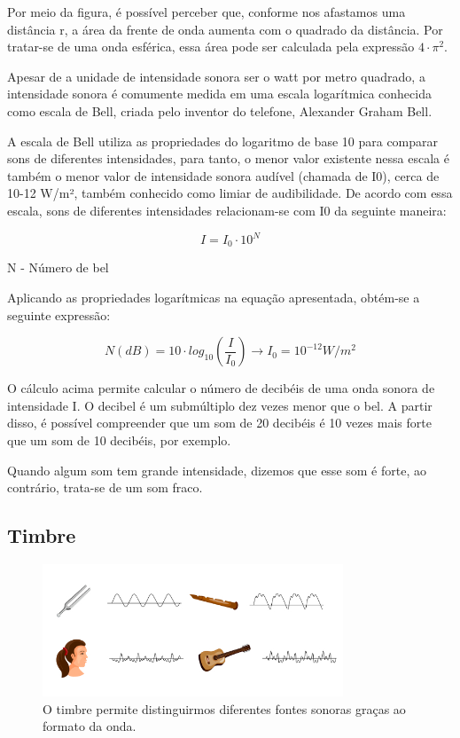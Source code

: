 \documentclass[
	article,		
	11pt,			
	oneside,		
	a4paper,			
	english,			
	brazil			
]{abntex2}
\begin{document}
Por meio da figura, é possível perceber que, conforme nos afastamos uma distância r, a área da frente de onda aumenta com o quadrado da distância. Por tratar-se de uma onda esférica, essa área pode ser calculada pela expressão $4 \cdot \pi^2$.

Apesar de a unidade de intensidade sonora ser o watt por metro quadrado, a intensidade sonora é comumente medida em uma escala logarítmica conhecida como escala de Bell, criada pelo inventor do telefone, Alexander Graham Bell.

A escala de Bell utiliza as propriedades do logaritmo de base 10 para comparar sons de diferentes intensidades, para tanto, o menor valor existente nessa escala é também o menor valor de intensidade sonora audível (chamada de I0), cerca de 10-12 W/m², também conhecido como limiar de audibilidade. De acordo com essa escala, sons de diferentes intensidades relacionam-se com I0 da seguinte maneira:

\begin{equation}
    I = I_0 \cdot 10^N
\end{equation}

\begin{center}
N - Número de bel
\end{center}

Aplicando as propriedades logarítmicas na equação apresentada, obtém-se a seguinte expressão:

\begin{equation}
    N(dB) = 10 \cdot log_{10} (\frac{I}{I_0}) \rightarrow I_0 = 10^{-12} W/m^2
\end{equation}

O cálculo acima permite calcular o número de decibéis de uma onda sonora de intensidade I. O decibel é um submúltiplo dez vezes menor que o bel. A partir disso, é possível compreender que um som de 20 decibéis é 10 vezes mais forte que um som de 10 decibéis, por exemplo.

Quando algum som tem grande intensidade, dizemos que esse som é forte, ao contrário, trata-se de um som fraco.

\subsection{Timbre}

\begin{figure}[h]
    \includegraphics[width=0.80\textwidth]{./imagens/timbre.jpg}
    \centering
    \caption{O timbre permite distinguirmos diferentes fontes sonoras graças ao formato da onda.}
    \label{fig:Timbre}
\end{figure}
\end{document}
